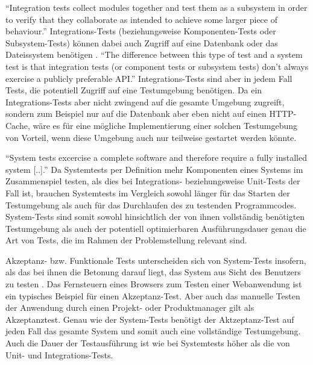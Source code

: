 
"`Integration tests collect modules together and test them as a subsystem in order to verify that they collaborate as intended to achieve some larger piece of behaviour."' \citep[S.][S. 10]{microservicetesting} Integrations-Tests (beziehungsweise Komponenten-Tests oder Subsystem-Tests) können dabei auch Zugriff auf eine Datenbank oder das Dateissystem benötigen \citep[Vgl.][S. 133]{DuvMatAnd07}. "`The difference between this type of test and a system test is that integration tests (or component tests or subsystem tests) don't always exercise a publicly preferable API."' \citep[S.][S. 136]{DuvMatAnd07} Integrations-Tests sind aber in jedem Fall Tests, die potentiell Zugriff auf eine Testumgebung benötigen. Da ein Integrations-Tests aber nicht zwingend auf die gesamte Umgebung zugreift, sondern zum Beispiel nur auf die Datenbank aber eben nicht auf einen HTTP-Cache, wäre es für eine mögliche Implementierung einer solchen Testumgebung von Vorteil, wenn diese Umgebung auch nur teilweise gestartet werden könnte.


"`System tests excercise a complete software and therefore require a fully installed system [..]."' \citep[S.][S. 136]{DuvMatAnd07} Da Systemtests per Definition mehr Komponenten eines Systems im Zusammenspiel testen, als dies bei Integrations- beziehungsweise Unit-Tests der Fall ist, brauchen Systemtests im Vergleich sowohl länger für das Starten der Testumgebung als auch für das Durchlaufen des zu testenden Programmcodes. \citep[Vgl.][S. 136]{DuvMatAnd07} System-Tests sind somit sowohl hinsichtlich der von ihnen vollständig benötigten Testumgebung als auch der potentiell optimierbaren Ausführungsdauer genau die Art von Tests, die im Rahmen der Problemstellung relevant sind.


Akzeptanz- bzw. Funktionale Tests unterscheiden sich von System-Tests insofern, als das bei ihnen die Betonung darauf liegt, das System aus Sicht des Benutzers zu testen \citep[Vgl.][S. 136]{DuvMatAnd07}. Das Fernsteuern eines Browsers zum Testen einer Webanwendung ist ein typisches Beispiel für einen Akzeptanz-Test. Aber auch das manuelle Testen der Anwendung durch einen Projekt- oder Produktmanager gilt als Akzeptanztest. Genau wie der System-Tests benötigt der Aktzeptanz-Test auf jeden Fall das gesamte System und somit auch eine vollständige Testumgebung. Auch die Dauer der Testausführung ist wie bei Systemtests höher als die von Unit- und Integrations-Tests.

